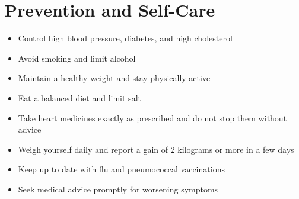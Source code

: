 \section*{Prevention and Self-Care}
\begin{itemize}
    \item Control high blood pressure, diabetes, and high cholesterol
    \item Avoid smoking and limit alcohol
    \item Maintain a healthy weight and stay physically active
    \item Eat a balanced diet and limit salt
    \item Take heart medicines exactly as prescribed and do not stop them without advice
    \item Weigh yourself daily and report a gain of 2 kilograms or more in a few days
    \item Keep up to date with flu and pneumococcal vaccinations
    \item Seek medical advice promptly for worsening symptoms
\end{itemize}
